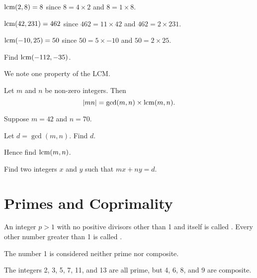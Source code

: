 \begin{example}
    $\mathrm{lcm}(2, 8) = 8$ since $8 = 4 \times 2$ and $8 = 1 \times 8$.
\end{example}

\begin{example}
    $\mathrm{lcm}(42, 231) = 462$ since $462 = 11 \times 42$ and $462 = 2 \times 231$.
\end{example}

\begin{example}
    $\mathrm{lcm}(-10, 25) = 50$ since $50 = 5 \times -10$ and $50 = 2 \times 25$.
\end{example}

\begin{exercise}
    Find $\mathrm{lcm}(-112, -35)$.
\end{exercise}

We note one property of the LCM.
\begin{proposition}\label{prop-product-of-gcd-and-lcm}
    Let $m$ and $n$ be non-zero integers. Then
    \[
        |mn| = \gcd(m,n) \times \mathrm{lcm}(m,n).
    \]
\end{proposition}

\begin{exercise}
    Suppose $m = 42$ and $n = 70$.
    \begin{partquestions}{\roman*}
        \item Let $d = \gcd(m,n)$. Find $d$.
        \item Hence find $\mathrm{lcm}(m,n)$.
        \item Find two integers $x$ and $y$ such that $mx + ny = d$.
    \end{partquestions}
\end{exercise}

\section{Primes and Coprimality}
\begin{definition}\label{definition-prime-number}
    An integer $p > 1$ with no positive divisors other than 1 and itself is called . Every other number greater than 1 is called .
\end{definition}
\begin{remark}
    The number 1 is considered neither prime nor composite.
\end{remark}

\begin{example}
    The integers 2, 3, 5, 7, 11, and 13 are all prime, but 4, 6, 8, and 9 are composite.
\end{example}

